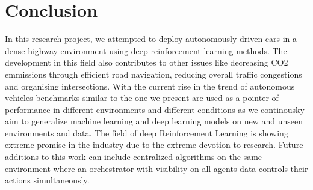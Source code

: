 \documentclass[conference]{IEEEtran}
\begin{document}
\section{Conclusion}
In this research project, we attempted to deploy autonomously driven cars in a dense highway environment using deep reinforcement learning methods. The development in this field also contributes to other
issues like decreasing CO2 emmissions through efficient road navigation, reducing overall traffic congestions and organising intersections. With the current rise in the trend of autonomous vehicles
benchmarks similar to the one we present are used as a pointer of performance in different environments and different conditions as we continousky aim to generalize machine learning and deep learning models
on new and unseen environments and data. The field of deep Reinforcement Learning is showing extreme promise in the industry due to the extreme devotion to research. Future additions to this work 
can include centralized algorithms on the same environment where an orchestrator with visibility on all agents data controls their actions simultaneously.

\end{document}
